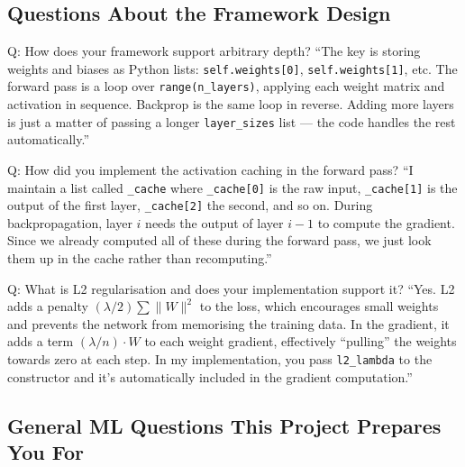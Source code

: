 \documentclass[12pt, a4paper]{article}
\begin{document}
\subsection{Questions About the Framework Design}

\begin{interviewbox}{Q: How does your framework support arbitrary depth?}
``The key is storing weights and biases as Python lists: \texttt{self.weights[0]}, \texttt{self.weights[1]}, etc. The forward pass is a loop over \texttt{range(n\_layers)}, applying each weight matrix and activation in sequence. Backprop is the same loop in reverse. Adding more layers is just a matter of passing a longer \texttt{layer\_sizes} list --- the code handles the rest automatically.''
\end{interviewbox}

\begin{interviewbox}{Q: How did you implement the activation caching in the forward pass?}
``I maintain a list called \texttt{\_cache} where \texttt{\_cache[0]} is the raw input, \texttt{\_cache[1]} is the output of the first layer, \texttt{\_cache[2]} the second, and so on. During backpropagation, layer $i$ needs the output of layer $i-1$ to compute the gradient. Since we already computed all of these during the forward pass, we just look them up in the cache rather than recomputing.''
\end{interviewbox}

\begin{interviewbox}{Q: What is L2 regularisation and does your implementation support it?}
``Yes. L2 adds a penalty $(\lambda/2) \sum \|W\|^2$ to the loss, which encourages small weights and prevents the network from memorising the training data. In the gradient, it adds a term $(\lambda/n) \cdot W$ to each weight gradient, effectively ``pulling'' the weights towards zero at each step. In my implementation, you pass \texttt{l2\_lambda} to the constructor and it's automatically included in the gradient computation.''
\end{interviewbox}

\subsection{General ML Questions This Project Prepares You For}
\end{document}
